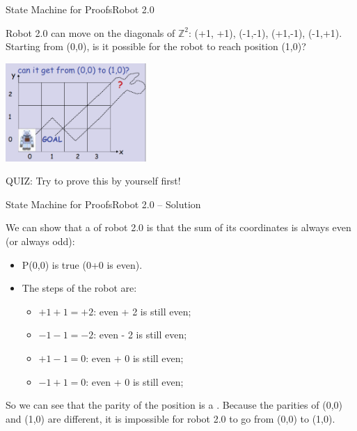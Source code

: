 \begin{frame}{State Machine for Proofs}{Robot 2.0}

  Robot 2.0 can move on the diagonals of $\mathbb{Z}^2$: (+1,
  +1), (-1,-1), (+1,-1), (-1,+1). Starting from (0,0), is it possible for the robot to reach position (1,0)?

  \begin{center}
    \includegraphics[width=0.4\textwidth]{../img/diag_robot}
  \end{center}

  \alert{QUIZ}: Try to prove this by yourself first!

\end{frame}


\begin{frame}{State Machine for Proofs}{Robot 2.0 -- Solution}

  We can show that a  of robot 2.0 is that the sum of its coordinates is always even (or always odd):\bigskip

  \begin{itemize}
  \item P(0,0) is true (0+0 is even).
  \item The steps of the robot are:
    \begin{itemize}
    \item $+1+1 = +2$: even + 2 is still even;
    \item $-1-1 = -2$: even - 2 is still even;
    \item $+1-1 = 0$: even + 0 is still even;
    \item $-1+1 = 0$: even + 0 is still even;
    \end{itemize}
  \end{itemize}
  \bigskip

  So we can see that the parity of the position is a . Because the parities of (0,0) and (1,0) are different, it is impossible for robot 2.0 to go from (0,0) to (1,0).
\end{frame}

